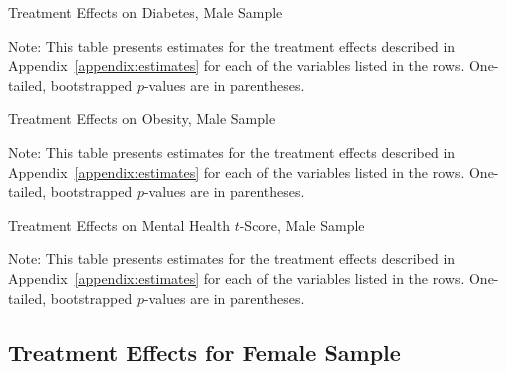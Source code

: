 	\begin{table}[H]
     \caption{Treatment Effects on Diabetes, Male Sample}
     \label{table:abccare_rslt_male_cat13}
	
	\end{table} 
\begin{spacing}{1}
\begin{footnotesize}
\noindent Note: This table presents estimates for the treatment effects described in Appendix~\ref{appendix:estimates} for each of the variables listed in the rows.  One-tailed, bootstrapped $p$-values are in parentheses.
\end{footnotesize}
\end{spacing}

	\begin{table}[H]
     \caption{Treatment Effects on Obesity, Male Sample}
     \label{table:abccare_rslt_male_cat14}
	
	\end{table} 
\begin{spacing}{1}
\begin{footnotesize}
\noindent Note: This table presents estimates for the treatment effects described in Appendix~\ref{appendix:estimates} for each of the variables listed in the rows.  One-tailed, bootstrapped $p$-values are in parentheses.
\end{footnotesize}
\end{spacing}

	\begin{table}[H]
     \caption{Treatment Effects on Mental Health $t$-Score, Male Sample}
     \label{table:abccare_rslt_male_cat15}
	
	\end{table} 
\begin{spacing}{1}
\begin{footnotesize}
\noindent Note: This table presents estimates for the treatment effects described in Appendix~\ref{appendix:estimates} for each of the variables listed in the rows.  One-tailed, bootstrapped $p$-values are in parentheses.
\end{footnotesize}
\end{spacing}




\subsection{Treatment Effects for Female Sample}


